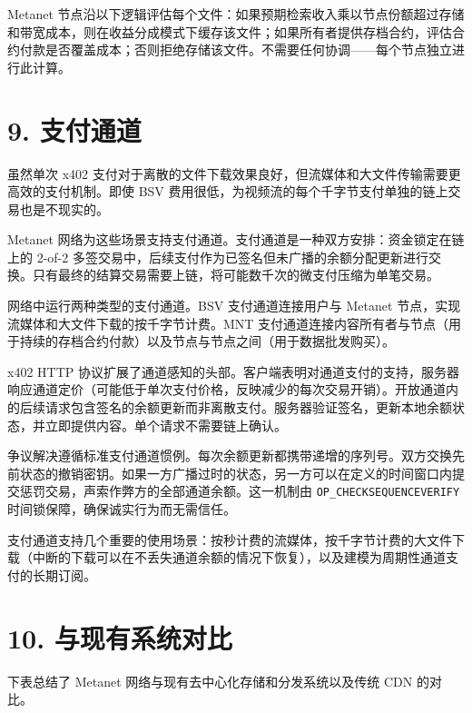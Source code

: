 \documentclass[11pt,a4paper]{article}
\begin{document}
Metanet 节点沿以下逻辑评估每个文件：如果预期检索收入乘以节点份额超过存储和带宽成本，则在收益分成模式下缓存该文件；如果所有者提供存档合约，评估合约付款是否覆盖成本；否则拒绝存储该文件。不需要任何协调——每个节点独立进行此计算。

\section{9. 支付通道}

虽然单次 x402 支付对于离散的文件下载效果良好，但流媒体和大文件传输需要更高效的支付机制。即使 BSV 费用很低，为视频流的每个千字节支付单独的链上交易也是不现实的。

Metanet 网络为这些场景支持支付通道。支付通道是一种双方安排：资金锁定在链上的 2-of-2 多签交易中，后续支付作为已签名但未广播的余额分配更新进行交换。只有最终的结算交易需要上链，将可能数千次的微支付压缩为单笔交易。

网络中运行两种类型的支付通道。BSV 支付通道连接用户与 Metanet 节点，实现流媒体和大文件下载的按千字节计费。MNT 支付通道连接内容所有者与节点（用于持续的存档合约付款）以及节点与节点之间（用于数据批发购买）。

x402 HTTP 协议扩展了通道感知的头部。客户端表明对通道支付的支持，服务器响应通道定价（可能低于单次支付价格，反映减少的每次交易开销）。开放通道内的后续请求包含签名的余额更新而非离散支付。服务器验证签名，更新本地余额状态，并立即提供内容。单个请求不需要链上确认。

争议解决遵循标准支付通道惯例。每次余额更新都携带递增的序列号。双方交换先前状态的撤销密钥。如果一方广播过时的状态，另一方可以在定义的时间窗口内提交惩罚交易，声索作弊方的全部通道余额。这一机制由 \texttt{OP\_CHECKSEQUENCEVERIFY} 时间锁保障，确保诚实行为而无需信任。

支付通道支持几个重要的使用场景：按秒计费的流媒体，按千字节计费的大文件下载（中断的下载可以在不丢失通道余额的情况下恢复），以及建模为周期性通道支付的长期订阅。

\section{10. 与现有系统对比}

下表总结了 Metanet 网络与现有去中心化存储和分发系统以及传统 CDN 的对比。
\end{document}
